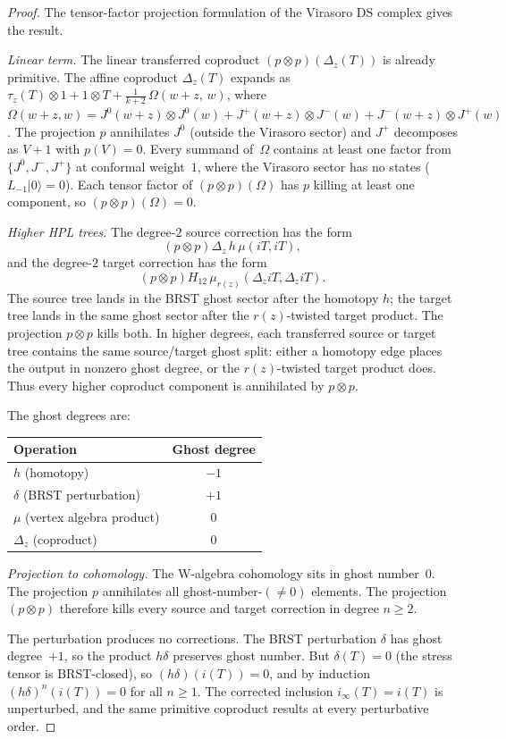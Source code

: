 \documentclass[11pt]{article}
\theoremstyle{plain}
\theoremstyle{definition}
\theoremstyle{remark}
\begin{document}
\begin{proof}
The tensor-factor projection formulation of the Virasoro DS complex
gives the result.

\emph{Linear term.} The linear transferred coproduct
$(p \otimes p)(\Delta_z(T))$ is already primitive. The
affine coproduct $\Delta_z(T)$ expands as
$\tau_z(T) \otimes 1 + 1 \otimes T + \frac{1}{k+2}\,\Omega(w{+}z,\,w)$,
where $\Omega(w{+}z, w) = J^0(w{+}z) \otimes J^0(w)
+ J^+(w{+}z) \otimes J^-(w) + J^-(w{+}z) \otimes J^+(w)$.
The projection $p$ annihilates $J^0$ (outside the Virasoro sector)
and $J^+$ decomposes as $V + 1$ with $p(V) = 0$. Every summand
of~$\Omega$ contains at least one factor from $\{J^0, J^-, J^+\}$
at conformal weight~$1$, where the Virasoro sector has no states
($L_{-1}|0\rangle = 0$). Each tensor factor of
$(p \otimes p)(\Omega)$ has $p$ killing at least one component,
so $(p \otimes p)(\Omega) = 0$.

\emph{Higher HPL trees.} The degree-$2$ source correction has the
form
\[
(p\otimes p)\Delta_z\,h\,\mu(iT,iT),
\]
and the degree-$2$ target correction has the form
\[
(p\otimes p)H_{12}\,\mu_{r(z)}(\Delta_z iT,\Delta_z iT).
\]
The source tree lands in the BRST ghost sector after the homotopy
$h$; the target tree lands in the same ghost sector after the
$r(z)$-twisted target product. The projection $p\otimes p$ kills
both. In higher degrees, each transferred source or target tree
contains the same source/target ghost split: either a homotopy edge
places the output in nonzero ghost degree, or the $r(z)$-twisted
target product does. Thus every higher coproduct component is
annihilated by $p\otimes p$.

The ghost degrees are:
\begin{center}
\small
\begin{tabular}{lc}
Operation & Ghost degree \\
\hline
$h$ (homotopy) & $-1$ \\
$\delta$ (BRST perturbation) & $+1$ \\
$\mu$ (vertex algebra product) & $0$ \\
$\Delta_z$ (coproduct) & $0$ \\
\end{tabular}
\end{center}

\emph{Projection to cohomology.} The W-algebra cohomology sits in ghost number~$0$.
The projection $p$ annihilates all ghost-number-$(\neq 0)$ elements.
The projection $(p \otimes p)$ therefore kills every source and
target correction in degree $n\geq2$.

The perturbation produces no corrections. The BRST
perturbation $\delta$ has ghost degree~$+1$, so the product
$h\delta$ preserves ghost number. But $\delta(T) = 0$ (the stress
tensor is BRST-closed), so $(h\delta)(i(T)) = 0$, and by induction
$(h\delta)^n(i(T)) = 0$ for all $n \geq 1$. The corrected inclusion
$i_\infty(T) = i(T)$ is unperturbed, and the same primitive coproduct
results at every perturbative order.
\end{proof}
\end{document}

